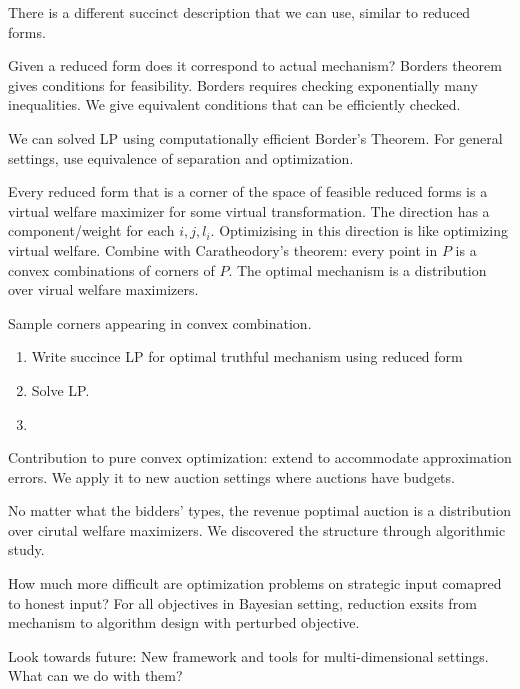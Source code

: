 There is a different succinct description that we can use, similar to reduced forms.

Given a reduced form does it correspond to actual mechanism? Borders theorem gives conditions for feasibility. Borders requires checking exponentially many inequalities. We give equivalent conditions that can be efficiently checked.

We can solved LP using computationally efficient Border's Theorem. For general settings, use equivalence of separation and optimization.

Every reduced form that is a corner of the space of feasible reduced forms is a virtual welfare maximizer for some virtual transformation. The direction has a component/weight for each $i,j,l_i$. Optimizising in this direction is like optimizing virtual welfare.
Combine with Caratheodory's theorem: every point in $P$ is a convex combinations of corners of $P$. The optimal mechanism is a distribution over virual welfare maximizers. 

Sample corners appearing in convex combination.

\begin{enumerate}
\item
Write succince LP for optimal truthful mechanism using reduced form
\item Solve LP.
\item
\end{enumerate}

Contribution to pure convex optimization: extend to accommodate approximation errors. We apply it to new auction settings where auctions have budgets.

No matter what the bidders' types, the revenue poptimal auction is a distribution over cirutal welfare maximizers. We discovered the structure through algorithmic study.

How much more difficult are optimization problems on strategic input comapred to honest input? For all objectives in Bayesian setting, reduction exsits from mechanism to algorithm design with perturbed objective.

Look towards future: %
New framework and tools for multi-dimensional settings. What can we do with them?

